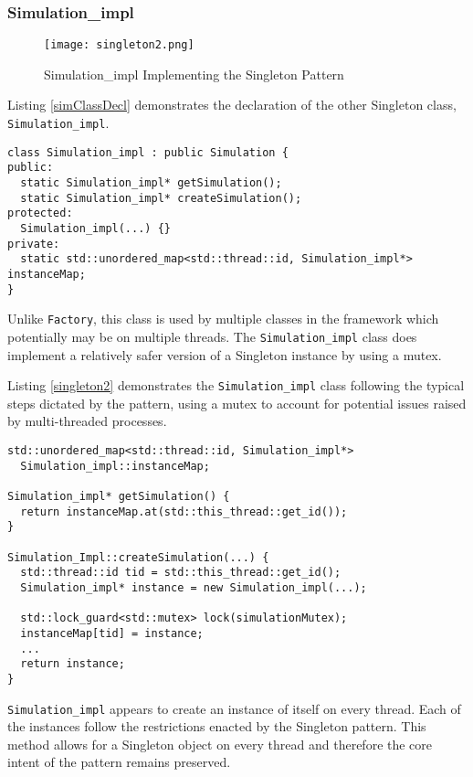 \subsubsection{Simulation\_impl}

\begin{figure}[ht]
    \caption{Simulation\_impl Implementing the Singleton Pattern}
    \centering
    \texttt{[image: singleton2.png]}
\end{figure}

Listing \ref{simClassDecl} demonstrates the declaration of the other Singleton class, \texttt{Simulation\_impl}.

\begin{lstlisting}[style=customC++,label=simClassDecl,caption=Excerpt of Simulation\_impl Interface \\ File: src/sst/core/simulation\_impl.h]
class Simulation_impl : public Simulation {
public:
  static Simulation_impl* getSimulation();
  static Simulation_impl* createSimulation();
protected:
  Simulation_impl(...) {}
private:
  static std::unordered_map<std::thread::id, Simulation_impl*> instanceMap;
}
\end{lstlisting}

Unlike \texttt{Factory}, this class is used by multiple classes in the framework which potentially may be on multiple threads. The \texttt{Simulation\_impl} class does implement a relatively safer version of a Singleton instance by using a mutex.

Listing \ref{singleton2} demonstrates the \texttt{Simulation\_impl} class following the typical steps dictated by the pattern, using a mutex to account for potential issues raised by multi-threaded processes.

\begin{lstlisting}[style=customC++,label=singleton2,caption=Simulation\_impl Implementing the Singleton Pattern \\ File: src/sst/core/simulation\_impl.cc]
std::unordered_map<std::thread::id, Simulation_impl*>
  Simulation_impl::instanceMap;

Simulation_impl* getSimulation() {
  return instanceMap.at(std::this_thread::get_id());
}

Simulation_Impl::createSimulation(...) {
  std::thread::id tid = std::this_thread::get_id();
  Simulation_impl* instance = new Simulation_impl(...);

  std::lock_guard<std::mutex> lock(simulationMutex);
  instanceMap[tid] = instance;
  ...
  return instance;
}
\end{lstlisting}

\texttt{Simulation\_impl} appears to create an instance of itself on every thread. Each of the instances follow the restrictions enacted by the Singleton pattern. This method allows for a Singleton object on every thread and therefore the core intent of the pattern remains preserved.
